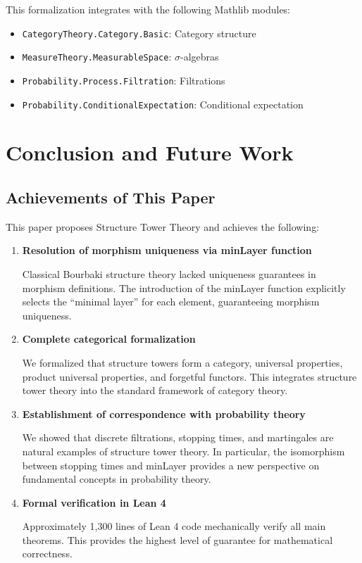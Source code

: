 \documentclass[11pt,a4paper]{article}
\theoremstyle{plain}
\theoremstyle{definition}
\begin{document}
This formalization integrates with the following Mathlib modules:
\begin{itemize}
  \item \texttt{CategoryTheory.Category.Basic}: Category structure
  \item \texttt{MeasureTheory.MeasurableSpace}: $\sigma$-algebras
  \item \texttt{Probability.Process.Filtration}: Filtrations
  \item \texttt{Probability.ConditionalExpectation}: Conditional expectation
\end{itemize}

\section{Conclusion and Future Work}
\label{sec:conclusion}

\subsection{Achievements of This Paper}

This paper proposes Structure Tower Theory and achieves the following:

\begin{enumerate}[label=\textbf{(\arabic*)}]
  \item \textbf{Resolution of morphism uniqueness via minLayer function}
  
  Classical Bourbaki structure theory lacked uniqueness guarantees in 
  morphism definitions. The introduction of the minLayer function 
  explicitly selects the ``minimal layer'' for each element, guaranteeing 
  morphism uniqueness.
  
  \item \textbf{Complete categorical formalization}
  
  We formalized that structure towers form a category, universal properties, 
  product universal properties, and forgetful functors. This integrates 
  structure tower theory into the standard framework of category theory.
  
  \item \textbf{Establishment of correspondence with probability theory}
  
  We showed that discrete filtrations, stopping times, and martingales 
  are natural examples of structure tower theory. In particular, the 
  isomorphism between stopping times and minLayer provides a new 
  perspective on fundamental concepts in probability theory.
  
  \item \textbf{Formal verification in Lean 4}
  
  Approximately 1,300 lines of Lean 4 code mechanically verify all main 
  theorems. This provides the highest level of guarantee for mathematical 
  correctness.
\end{enumerate}
\end{document}

